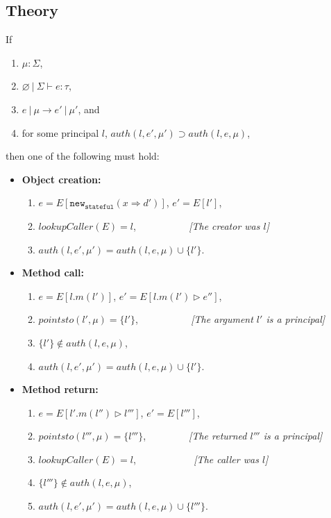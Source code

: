 \documentclass{llncs}
\newcommand{\keywadj}[1]{\mathtt{#1}}
\begin{document}
\newpage

\subsection{Theory}

\begin{theorem} If
\begin{enumerate}
\item $\mu : \Sigma$,
\item $\varnothing~|~\Sigma \vdash e : \tau$,
\item $e~|~\mu \longrightarrow e'~|~\mu'$, and
\item for some principal $l$, $auth(l, e', \mu') \supset auth(l, e, \mu)$,
\end{enumerate}
then one of the following must hold:
\begin{itemize}
  \item \textbf{Object creation:}
  \begin{enumerate}
  \item $e = E[\keywadj{new}_{\keywadj{stateful}}(x \Rightarrow d')]$, $e' = E[l']$,
  \item $lookupCaller(E) = l$, {\emph{~~~~~~~~~~[The creator was $l$]}}
  \item $auth(l, e', \mu') = auth(l, e, \mu) \cup \{ l' \}$.\\
  \end{enumerate}
  \item \textbf{Method call:}
  \begin{enumerate}
  \item $e = E[l.m(l')]$, $e' = E[l.m(l') \rhd e'']$,
  \item $pointsto(l',\mu) = \{ l' \}$, {\emph{~~~~~~~~~~[The argument $l'$ is a principal]}}
  \item $\{ l' \} \not\in auth(l, e, \mu)$,
  \item $auth(l, e', \mu') = auth(l, e, \mu) \cup \{ l' \}$.\\
  \end{enumerate}
  \item \textbf{Method return:}
  \begin{enumerate}
  \item $e = E[l'.m(l'') \rhd l''']$, $e' = E[l''']$,
  \item $pointsto(l''',\mu) = \{ l''' \}$, {\emph{~~~~~~~~[The returned $l'''$ is a principal]}}
  \item $lookupCaller(E) = l$, {\emph{~~~~~~~~~~~[The caller was $l$]}}
  \item $\{ l''' \} \not\in auth(l, e, \mu)$,
  \item $auth(l, e', \mu') = auth(l, e, \mu) \cup \{ l''' \}$.\\
  \end{enumerate}
\end{itemize}

\end{theorem}
\end{document}
